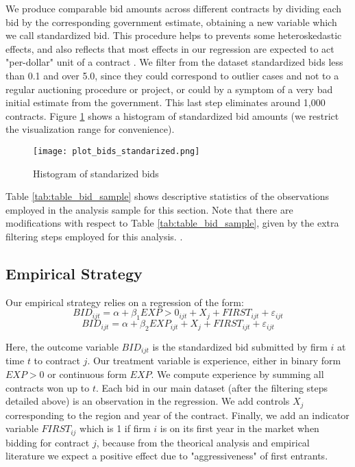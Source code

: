 We produce comparable bid amounts across different contracts by dividing each bid by the corresponding government estimate, obtaining a new variable which we call standardized bid. This procedure helps to prevents some heteroskedastic effects, and also reflects that most effects in our regression are expected to act "per-dollar" unit of a contract \citep{bajari2014bidding}. We filter from the dataset standardized bids less than 0.1 and over 5.0, since they could correspond to outlier cases and not to a regular auctioning procedure or project, or could by a symptom of a very bad initial estimate from the government. This last step eliminates around 1,000 contracts. Figure \ref{fig:plot_bids_standarized} shows a histogram of standardized bid amounts (we restrict the visualization range for convenience).

\begin{figure}
  \centering
  \texttt{[image: plot\_bids\_standarized.png]}
  \caption{Histogram of standarized bids}
  \label{fig:plot_bids_standarized}
\end{figure}

Table \ref{tab:table_bid_sample} shows descriptive statistics of the observations employed in the analysis sample for this section. Note that there are modifications with respect to Table \ref{tab:table_bid_sample}, given by the extra filtering steps employed for this analysis. .

\subsection{Empirical Strategy}

Our empirical strategy relies on a regression of the form:
\begin{equation}
\label{eqn:olsbids}
BID_{ijt}=\alpha+ \beta_1 EXP>0_{ijt}+X_j+FIRST_{ijt}+\varepsilon_{ijt}
\end{equation}
\begin{equation}
\label{eqn:olsbids2}
BID_{ijt}=\alpha+ \beta_2 EXP_{ijt}+X_j+FIRST_{ijt}+\varepsilon_{ijt}
\end{equation}

Here, the outcome variable $BID_{ijt}$ is the standardized bid submitted by firm  $i$ at time $t$  to contract $j$. Our treatment variable is experience, either in binary form $EXP>0$ or continuous form $EXP$. We compute experience by summing all contracts won up to $t$. Each bid in our main dataset (after the filtering steps detailed above) is an observation in the regression. We add controls $X_j$ corresponding to the region and year of the contract. Finally, we add an indicator variable $FIRST_{ij}$ which is 1 if firm $i$ is on its first year in the market when bidding for contract $j$, because from the theorical analysis and empirical literature we expect a positive effect due to "aggressiveness" of first entrants.

